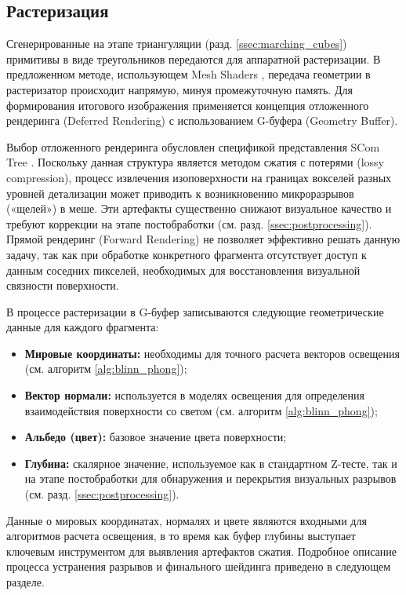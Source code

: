 \subsection{Растеризация} \label{ssec:raster}

Сгенерированные на этапе триангуляции (разд. \ref{ssec:marching_cubes}) примитивы в виде треугольников передаются для аппаратной растеризации. В предложенном методе, использующем Mesh Shaders \cite{nvidia_mesh_shaders}, передача геометрии в растеризатор происходит напрямую, минуя промежуточную память. Для формирования итогового изображения применяется концепция отложенного рендеринга (Deferred Rendering) с использованием G-буфера (Geometry Buffer).

Выбор отложенного рендеринга обусловлен спецификой представления SCom Tree \cite{garifullin2025compact}. Поскольку данная структура является методом сжатия с потерями (lossy compression), процесс извлечения изоповерхности на границах вокселей разных уровней детализации может приводить к возникновению микроразрывов («щелей») в меше. Эти артефакты существенно снижают визуальное качество и требуют коррекции на этапе постобработки (см. разд. \ref{ssec:postprocessing}). Прямой рендеринг (Forward Rendering) не позволяет эффективно решать данную задачу, так как при обработке конкретного фрагмента отсутствует доступ к данным соседних пикселей, необходимых для восстановления визуальной связности поверхности.

В процессе растеризации в G-буфер записываются следующие геометрические данные для каждого фрагмента:
\begin{itemize}
    \item \textbf{Мировые координаты:} необходимы для точного расчета векторов освещения (см. алгоритм \ref{alg:blinn_phong});
    \item \textbf{Вектор нормали:} используется в моделях освещения для определения взаимодействия поверхности со светом (см. алгоритм \ref{alg:blinn_phong});
    \item \textbf{Альбедо (цвет):} базовое значение цвета поверхности;
    \item \textbf{Глубина:} скалярное значение, используемое как в стандартном Z-тесте, так и на этапе постобработки для обнаружения и перекрытия визуальных разрывов (см. разд. \ref{ssec:postprocessing}).
\end{itemize}

Данные о мировых координатах, нормалях и цвете являются входными для алгоритмов расчета освещения, в то время как буфер глубины выступает ключевым инструментом для выявления артефактов сжатия. Подробное описание процесса устранения разрывов и финального шейдинга приведено в следующем разделе.

